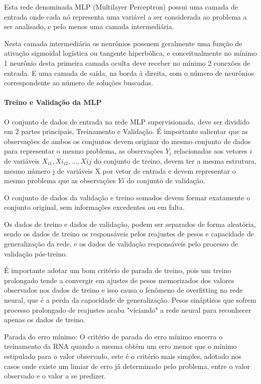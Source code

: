 \documentclass[	12pt, Times, openright, twoside, a4paper, english, brazil]{abntex2}
\begin{document}
  	       Esta rede denominada MLP (Multilayer Perceptron) possui uma camada de entrada onde cada nó representa uma variável a ser considerada ao problema a ser analisado, e pelo menos uma camada intermediária.
  	      
  	       Nesta camada intermediária os neurônios possuem geralmente uma função de ativação sigmoidal logística ou tangente hiperbólica, e conceitualmente no mínimo 1 neurônio desta primeira camada oculta deve receber no mínimo 2 conexões de entrada. E uma camada de saída, na borda à direita, com o número de neurônios correspondente ao número de soluções buscadas. 
  	       
            \paragraph{Treino e Validação da MLP}
            	O conjunto de dados de entrada na rede MLP supervisionada, deve ser dividido em 2 partes principais, Treinamento e Validação. É importante salientar que as observações de ambos os conjuntos devem originar do mesmo conjunto de dados para representar o mesmo problema, as observações $Y_i$ relacionadas aos vetores $i$ de variáveis $X_{i1},Xi_{i2},...,X{ij}$ do conjunto de treino, devem ter a mesma estrutura, mesmo número j de variáveis X por vetor de entrada e devem representar o mesmo problema que as observações $Yi$ do conjunto de validação.
            	
            	O conjunto de dados da validação e treino somados devem formar exatamente o conjunto original, sem informações excedentes ou em falta.
            	
            	Os dados de treino e dados de validação, podem ser separados de forma aleatória, sendo os dados de treino os responsáveis pelos reajustes de pesos e capacidade de generalização da rede, e os dados de validação responsáveis pelo processo de validação pós-treino.
            	
            	É importante adotar um bom critério de parada de treino, pois um treino prolongado tende a convergir em ajustes de pesos memorizados dos valores observados nos dados de treino e isso causa o fenômeno de overfitting na rede neural, que é a perda da capacidade de generalização. Pesos sinápticos que sofrem processo prolongado de reajustes acaba "viciando" a rede neural para reconhecer apenas os dados de treino.
            	
            	Parada do erro mínimo:
            	O critério de parada do erro mínimo encerra o treinamento da RNA quando a mesma obtém um erro menor que o mínimo estipulado para o valor observado, este é o critério mais simples, adotado nos casos onde existe um limiar de erro já determinado pelo problema, entre o valor observado e o valor a se predizer.
            	
\end{document}
